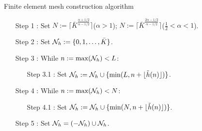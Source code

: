 \begin{algorithm}[H]
	\caption{Finite element mesh construction algorithm}
	\label{alg:FEM}
	\begin{enumerate}
		\item[Step 1]: Set $N:= \lceil \bar{K}^{\frac{\alpha+1/2}{\alpha-1/2}}\rceil$($\alpha>1$); $N:= \lceil \bar{K}^{\frac{2\alpha-1/2}{\alpha-1/2}}\rceil$($\frac{1}{2}< \alpha< 1$). 
		\item[Step 2]: Set $\mathcal{N}_{h} :=\{0, 1, \dots, \bar{K}\}$.  		
		\item[Step 3]: While $n:=\max (\mathcal{N}_{h}) <L$:
		\begin{enumerate}
			\item[Step 3.1]: Set $\mathcal{N}_{h}:=\mathcal{N}_{h} \cup \{\min(L,n+\lfloor \tilde{h}(n)\rfloor ) \}$.
		\end{enumerate}
		\item[Step 4]: While $n:=\max (\mathcal{N}_{h}) <N$:
		\begin{enumerate}
			\item[Step 4.1]: Set $\mathcal{N}_{h}:=\mathcal{N}_{h} \cup \{\min(N,n+\lfloor \tilde{h}(n)\rfloor ) \}$.
		\end{enumerate}
		\item[Step 5]: Set $\mathcal{N}_{h} = (-\mathcal{N}_{h}) \cup \mathcal{N}_{h}$.
	\end{enumerate}
\end{algorithm}








